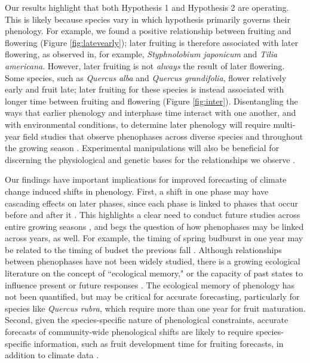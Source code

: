 \documentclass{article}
\begin{document}
\par Our results highlight that both Hypothesis 1 and Hypothesis 2 are operating. This is likely because species vary in which hypothesis primarily governs their phenology. For example, we found a positive relationship between fruiting and flowering (Figure \ref{fig:latevearly}); later fruiting is therefore associated with later flowering, as observed in, for example, \textit{Styphnolobium japonicum} and \textit{Tilia americana}. However, later fruiting is not \textit{always} the result of later flowering. Some species, such as \textit{Quercus alba} and \textit{Quercus grandifolia}, flower relatively early and fruit late; later fruiting for these species is instead associated with longer time between fruiting and flowering (Figure \ref{fig:inter}). Disentangling the ways that earlier phenology and interphase time interact with one another, and with environmental conditions, to determine later phenology will require multi-year field studies that observe phenophases across diverse species and throughout the growing season \citep[e.g.][]{elmendorf2016}. Experimental manipulations will also be beneficial for discerning the physiological and genetic bases for the relationships we observe \citep{flint1974}.

\par Our findings have important implications for improved forecasting of climate change induced shifts in phenology. First, a shift in one phase may have cascading effects on later phases, since each phase is linked to phases that occur before and after it \citep{wolkovich2014b}. This highlights a clear need to conduct future studies across entire growing seasons \citep{wolkovich2014}, and begs the question of how phenophases may be linked across years, as well.  For example, the timing of spring budburst in one year may be related to the timing of budset the previous fall \citep {mimura2010}. Although relationships between phenophases have not been widely studied, there is a growing ecological literature on the concept of ``ecological memory," or the capacity of past states to influence present or future responses \citep {ogle2015}. The ecological memory of phenology has not been quantified, but may be critical for accurate forecasting, particularly for species like \emph{Quercus rubra}, which require more than one year for fruit maturation. Second, given the species-specific nature of phenological constraints, accurate forecasts of community-wide phenological shifts are likely to require species-specific information, such as fruit development time for fruiting forecasts, in addition to climate data \citep{diez2012}.
\end{document}
